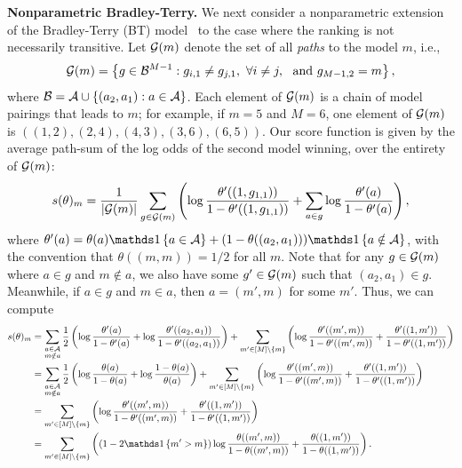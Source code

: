 \documentclass{article}
\begin{document}
\textbf{Nonparametric Bradley-Terry.} We next consider a nonparametric extension of the Bradley-Terry (BT) model~\citep{bradley1952rank} to the case where the ranking is not necessarily transitive.
Let $\mathcal{G}(m)$ denote the set of all \emph{paths} to the model $m$, i.e., 
\begin{equation}
    \mathcal{G}(m) = \left\{g \in \mathcal{B}^{M-1} : g_{i,1} \neq g_{j,1},\ \forall i\neq j,\ \text{ and } g_{M-1,2}=m \right\},
\end{equation}
where $\mathcal{B} = \mathcal{A} \cup \{ (a_2, a_1) : a \in \mathcal{A} \}$.
Each element of $\mathcal{G}(m)$ is a chain of model pairings that leads to $m$; for example, if $m=5$ and $M=6$, one element of $\mathcal{G}(m)$ is $( (1, 2), (2, 4), (4, 3), (3, 6), (6, 5) )$.
Our score function is given by the average path-sum of the log odds of the second model winning, over the entirety of $\mathcal{G}(m)$:
\begin{equation}
    \label{eq:bt-score}
    s(\theta)_m = \frac{1}{|\mathcal{G}(m)|}\sum_{g \in \mathcal{G}(m)} \left( \log \frac{\theta'((1,g_{1,1}))}{1-\theta'((1,g_{1,1}))} + \sum_{a \in g} \log \frac{\theta'(a)}{1-\theta'(a)}\right),
\end{equation}
where $\theta'(a) = \theta(a)\ind{a \in \cA} + (1-\theta((a_2, a_1)))\ind{a \notin \cA}$, with the convention that $\theta((m,m))=1/2$ for all $m$.
Note that for any $g \in \mathcal{G}(m)$ where $a \in g$ and $m \notin a$, we also have some $g' \in \mathcal{G}(m)$ such that $(a_2, a_1) \in g$.
Meanwhile, if $a \in g$ and $m \in a$, then $a = (m', m)$ for some $m'$.
Thus, we can compute
\begin{align}
    s(\theta)_m &= \sum\limits_{\substack{a \in \cA \\ m \notin a}} \frac{1}{2}\left(\log\frac{\theta'(a)}{1-\theta'(a)} + \log\frac{\theta'((a_2,a_1))}{1-\theta'((a_2,a_1))}\right) + \sum\limits_{m' \in [M]\setminus \{m\}} \left( \log\frac{\theta'((m',m))}{1-\theta'((m',m))} + \frac{\theta'((1,m'))}{1-\theta'((1,m'))} \right) \\
    & = \sum\limits_{\substack{a \in \cA \\ m \notin a}} \frac{1}{2}\left(\log\frac{\theta(a)}{1-\theta(a)} + \log\frac{1-\theta(a)}{\theta(a)}\right) + \sum\limits_{m' \in [M]\setminus \{m\}} \left( \log\frac{\theta'((m',m))}{1-\theta'((m',m))} + \frac{\theta'((1,m'))}{1-\theta'((1,m'))} \right) \\
    & = \sum\limits_{m' \in [M]\setminus \{m\}} \left( \log\frac{\theta'((m',m))}{1-\theta'((m',m))} + \frac{\theta'((1,m'))}{1-\theta'((1,m'))} \right) \\
    & = \sum\limits_{m' \in [M]\setminus \{m\}} \left( (1-2\ind{m' > m})\log\frac{\theta((m',m))}{1-\theta((m',m))} + \frac{\theta((1,m'))}{1-\theta((1,m'))} \right).
    \label{eq:np-bt-computable}
\end{align}
\end{document}
